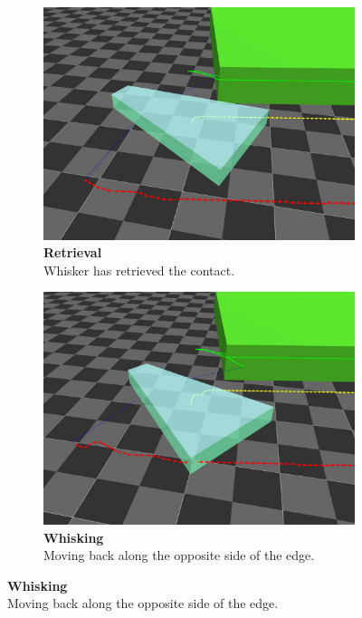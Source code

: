 \begin{figure}[H]
\begin{subfigure}[b]{0.48\textwidth}
        \centering
        \captionsetup{justification=centering}
        \includegraphics[width=\textwidth]{figures/retrieval/retrieval}
        \caption{\textbf{Retrieval}\\Whisker has retrieved the contact.}
        \label{fig:retrieval-1-2}
    \end{subfigure}
    \begin{subfigure}[b]{0.48\textwidth}
        \centering
        \captionsetup{justification=centering}
        \includegraphics[width=\textwidth]{figures/retrieval/whisking}
        \caption{\textbf{Whisking}\\Moving back along the opposite side of the edge.}
        \label{fig:retrieval-2-1}
    \end{subfigure}\hfill

\end{figure}
